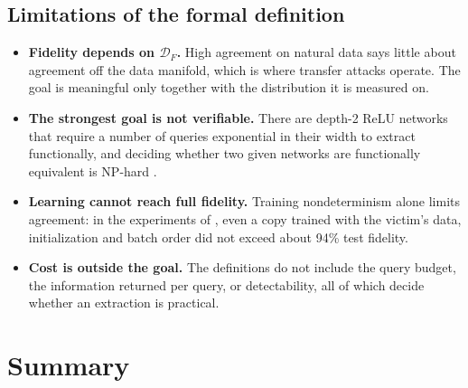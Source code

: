 \documentclass[10pt,a4paper]{extarticle}
\theoremstyle{definition}
\newcommand{\D}{\mathcal{D}}
\begin{document}
\subsection{Limitations of the formal definition}

\begin{itemize}[leftmargin=1.5em]
  \item \textbf{Fidelity depends on $\D_F$.} High agreement on natural data says little about agreement off the data manifold, which is where transfer attacks operate. The goal is meaningful only together with the distribution it is measured on.
  \item \textbf{The strongest goal is not verifiable.} There are depth-2 ReLU networks that require a number of queries exponential in their width to extract functionally, and deciding whether two given networks are functionally equivalent is NP-hard \citep{jagielski2020high}.
  \item \textbf{Learning cannot reach full fidelity.} Training nondeterminism alone limits agreement: in the experiments of \citet{jagielski2020high}, even a copy trained with the victim's data, initialization and batch order did not exceed about 94\% test fidelity.
  \item \textbf{Cost is outside the goal.} The definitions do not include the query budget, the information returned per query, or detectability, all of which decide whether an extraction is practical.
\end{itemize}

\section*{Summary}
\end{document}
